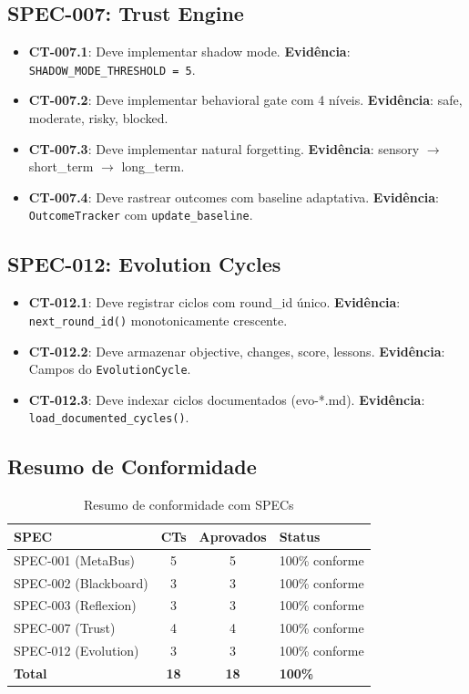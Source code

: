 \subsection{SPEC-007: Trust Engine}

\begin{itemize}
    \item[\checkmark] \textbf{CT-007.1}: Deve implementar shadow mode. \textbf{Evidência}: \texttt{SHADOW\_MODE\_THRESHOLD = 5}.
    \item[\checkmark] \textbf{CT-007.2}: Deve implementar behavioral gate com 4 níveis. \textbf{Evidência}: safe, moderate, risky, blocked.
    \item[\checkmark] \textbf{CT-007.3}: Deve implementar natural forgetting. \textbf{Evidência}: sensory $\rightarrow$ short\_term $\rightarrow$ long\_term.
    \item[\checkmark] \textbf{CT-007.4}: Deve rastrear outcomes com baseline adaptativa. \textbf{Evidência}: \texttt{OutcomeTracker} com \texttt{update\_baseline}.
\end{itemize}

\subsection{SPEC-012: Evolution Cycles}

\begin{itemize}
    \item[\checkmark] \textbf{CT-012.1}: Deve registrar ciclos com round\_id único. \textbf{Evidência}: \texttt{next\_round\_id()} monotonicamente crescente.
    \item[\checkmark] \textbf{CT-012.2}: Deve armazenar objective, changes, score, lessons. \textbf{Evidência}: Campos do \texttt{EvolutionCycle}.
    \item[\checkmark] \textbf{CT-012.3}: Deve indexar ciclos documentados (evo-*.md). \textbf{Evidência}: \texttt{load\_documented\_cycles()}.
\end{itemize}

\subsection{Resumo de Conformidade}

\begin{table}[htbp]
\centering
\caption{Resumo de conformidade com SPECs}
\label{tab:spec-summary}
\begin{tabular}{@{}p{3cm}ccp{5cm}@{}}
\toprule
\textbf{SPEC} & \textbf{CTs} & \textbf{Aprovados} & \textbf{Status} \\
\midrule
SPEC-001 (MetaBus) & 5 & 5 & 100\% conforme \\
SPEC-002 (Blackboard) & 3 & 3 & 100\% conforme \\
SPEC-003 (Reflexion) & 3 & 3 & 100\% conforme \\
SPEC-007 (Trust) & 4 & 4 & 100\% conforme \\
SPEC-012 (Evolution) & 3 & 3 & 100\% conforme \\
\midrule
\textbf{Total} & \textbf{18} & \textbf{18} & \textbf{100\%} \\
\bottomrule
\end{tabular}
\end{table}

